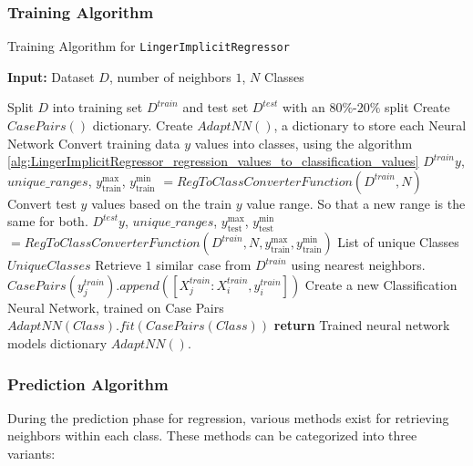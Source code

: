 \documentclass[a4paper, 12pt]{report}
\begin{document}
\subsubsection{Training Algorithm}
\begin{algorithm}[H]
    \caption{Training Algorithm for \texttt{LingerImplicitRegressor}}
    \label{alg:LingerImplicitRegressor_train}
    \textbf{Input:} Dataset $D$, number of neighbors $1$, $N$ Classes 
    \begin{algorithmic}
        \State Split $D$ into training set $D^{train}$ and test set $D^{test}$ with an $80\%$-$20\%$ split
        \State Create $CasePairs()$ dictionary.
        \State Create $AdaptNN()$, a dictionary to store each Neural Network
        \State Convert training data $y$ values into classes, using the algorithm \ref{alg:LingerImplicitRegressor_regression_values_to_classification_values}
        \State $D^{train}y$, $unique\_ranges$, $y_{\text{train}}^\text{max}$, $y_{\text{train}}^\text{min}$ $= Reg To Class Converter Function(D^{train}, N)$
        \State Convert test $y$ values based on the train $y$ value range. So that a new range is the same for both.
        \State $D^{test}y$, $unique\_ranges$, $y_{\text{test}}^\text{max}$, $y_{\text{test}}^\text{min}$ $= Reg To Class Converter Function(D^{train}, N, y_{\text{train}}^\text{max}, y_{\text{train}}^\text{min})$
        \State List of unique Classes $UniqueClasses$
            \State Retrieve $1$ similar case from $D^{train}$ using nearest neighbors.
                \State $CasePairs(y^{train}_j).append([X^{train}_j:X^{train}_i, y^{train}_i])$
            \EndFor
        \EndFor
            \State Create a new Classification Neural Network, trained on Case Pairs
            \State $AdaptNN(Class).fit(CasePairs(Class))$
        \EndFor
        \State \textbf{return} Trained neural network models dictionary $AdaptNN()$.
    \end{algorithmic}
\end{algorithm}

\subsubsection{Prediction Algorithm}
During the prediction phase for regression, various methods exist for retrieving neighbors within each class. These methods can be categorized into three variants:
\end{document}
